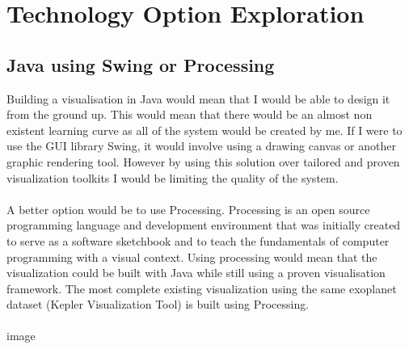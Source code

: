 \documentclass[11pt
              , a4paper
              , twoside
              , openright
              ]{report}
\begin{document}
\section{Technology Option Exploration}
\subsection{Java using Swing or Processing}
Building a visualisation in Java would mean that I would be able to design it from the ground up. This would mean that there would be an almost non existent learning curve as all of the system would be created by me.  If I were to use the GUI library Swing, it would involve using a drawing canvas or another graphic rendering tool. However by using this solution over tailored and  proven visualization toolkits I would be limiting the quality of the system.
\\\\
A better option would be to use Processing. Processing is an open source programming language and development environment that was initially created to serve as a software sketchbook and to teach the fundamentals of computer programming with a visual context. Using processing would mean that the visualization could be built with Java while still using a proven visualisation framework. The most complete existing visualization using the same exoplanet dataset (Kepler Visualization Tool) is built using Processing. 
\\\\
image
\end{document}
